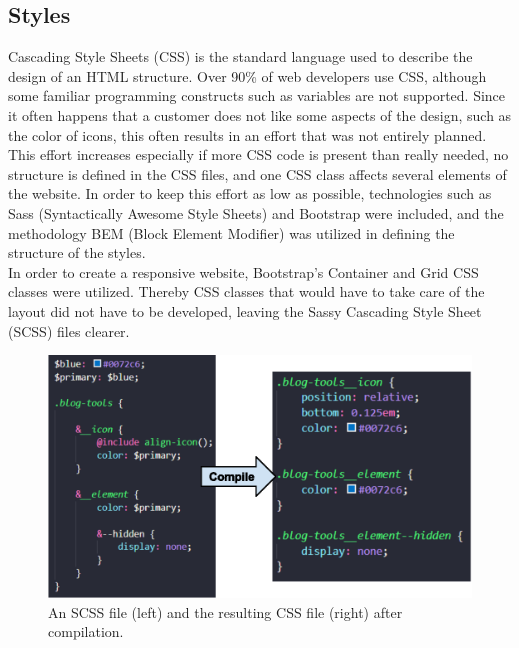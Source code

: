 \documentclass[Bachelor,BIF,english]{twbook}
\begin{document}
\subsection{Styles}
Cascading Style Sheets (CSS) is the standard language used to describe the design of an HTML structure. Over 90\% of web developers use CSS, although some familiar programming constructs such as variables are not supported. Since it often happens that a customer does not like some aspects of the design, such as the color of icons, this often results in an effort that was not entirely planned. This effort increases especially if more CSS code is present than really needed, no structure is defined in the CSS files, and one CSS class affects several elements of the website. In order to keep this effort as low as possible, technologies such as Sass (Syntactically Awesome Style Sheets) \cite{Sass} and Bootstrap \cite{Bootstrap} were included, and the methodology BEM (Block Element Modifier) \cite{BEM} was utilized in defining the structure of the styles.
\\[\baselineskip]
In order to create a responsive website, Bootstrap's Container \cite{BootstrapContainer} and Grid \cite{BootstrapGrid} CSS classes were utilized. Thereby CSS classes that would have to take care of the layout did not have to be developed, leaving the Sassy Cascading Style Sheet (SCSS) files clearer.
\\[\baselineskip]
\begin{figure}[!htbp]
\centering
\includegraphics[width=0.75\linewidth]{PICs/sass_parent-selector_mixins_variables.eps}
\caption{An SCSS file (left) and the resulting CSS file (right) after compilation.}\label{FigSass}
\end{figure}
\end{document}
